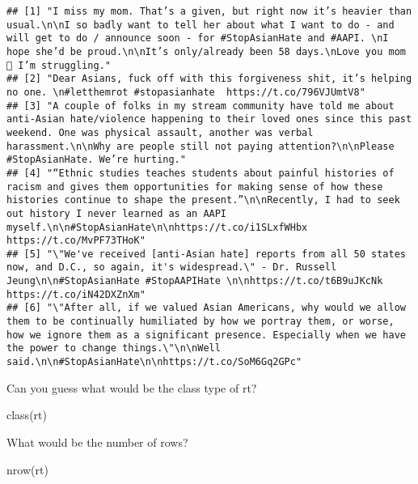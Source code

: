 \documentclass[
]{book}
\newenvironment{Shaded}{\begin{snugshade}}{\end{snugshade}}
\newcommand{\FunctionTok}[1]{\textcolor[rgb]{0.00,0.00,0.00}{#1}}
\newcommand{\NormalTok}[1]{#1}
\begin{document}
\begin{verbatim}
## [1] "I miss my mom. That’s a given, but right now it’s heavier than usual.\n\nI so badly want to tell her about what I want to do - and will get to do / announce soon - for #StopAsianHate and #AAPI. \nI hope she’d be proud.\n\nIt’s only/already been 58 days.\nLove you mom 🖤 I’m struggling."                         
## [2] "Dear Asians, fuck off with this forgiveness shit, it’s helping no one. \n#letthemrot #stopasianhate  https://t.co/796VJUmtV8"                                                                                                                                                                                          
## [3] "A couple of folks in my stream community have told me about anti-Asian hate/violence happening to their loved ones since this past weekend. One was physical assault, another was verbal harassment.\n\nWhy are people still not paying attention?\n\nPlease #StopAsianHate. We’re hurting."                           
## [4] "“Ethnic studies teaches students about painful histories of racism and gives them opportunities for making sense of how these histories continue to shape the present.”\n\nRecently, I had to seek out history I never learned as an AAPI myself.\n\n#StopAsianHate\n\nhttps://t.co/i1SLxfWHbx https://t.co/MvPF73THoK"
## [5] "\"We've received [anti-Asian hate] reports from all 50 states now, and D.C., so again, it's widespread.\" - Dr. Russell Jeung\n\n#StopAsianHate #StopAAPIHate \n\nhttps://t.co/t6B9uJKcNk https://t.co/iN42DXZnXm"                                                                                                     
## [6] "\"After all, if we valued Asian Americans, why would we allow them to be continually humiliated by how we portray them, or worse, how we ignore them as a significant presence. Especially when we have the power to change things.\"\n\nWell said.\n\n#StopAsianHate\n\nhttps://t.co/SoM6Gq2GPc"
\end{verbatim}

Can you guess what would be the class type of rt?

\begin{Shaded}
\begin{Highlighting}[]
\FunctionTok{class}\NormalTok{(rt)}
\end{Highlighting}
\end{Shaded}

What would be the number of rows?

\begin{Shaded}
\begin{Highlighting}[]
\FunctionTok{nrow}\NormalTok{(rt)}
\end{Highlighting}
\end{Shaded}
\end{document}
